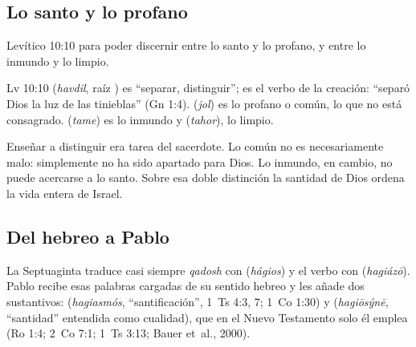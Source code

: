 
\subsection{Lo santo y lo profano}
\begin{verso}{Levítico 10:10}
para poder discernir entre lo santo y lo profano, y entre lo inmundo y lo limpio.
\end{verso}

\begin{filologiatexto}{Lv 10:10}
 (\emph{havdil}, raíz ) es ``separar, distinguir''; es el verbo de la creación: ``separó Dios la luz de las tinieblas'' (Gn 1:4).  (\emph{jol}) es lo profano o común, lo que no está consagrado.  (\emph{tame}) es lo inmundo y  (\emph{tahor}), lo limpio.
\end{filologiatexto}

Enseñar a distinguir era tarea del sacerdote. Lo común no es necesariamente malo: simplemente no ha sido apartado para Dios. Lo inmundo, en cambio, no puede acercarse a lo santo. Sobre esa doble distinción la santidad de Dios ordena la vida entera de Israel.

\subsection{Del hebreo a Pablo}
La Septuaginta traduce casi siempre \emph{qadosh} con  (\emph{hágios}) y el verbo con  (\emph{hagiázō}). Pablo recibe esas palabras cargadas de su sentido hebreo y les añade dos sustantivos:  (\emph{hagiasmós}, ``santificación'', 1~Ts 4:3, 7; 1~Co 1:30) y  (\emph{hagiōsýnē}, ``santidad'' entendida como cualidad), que en el Nuevo Testamento solo él emplea (Ro 1:4; 2~Co 7:1; 1~Ts 3:13; Bauer et~al., 2000).

